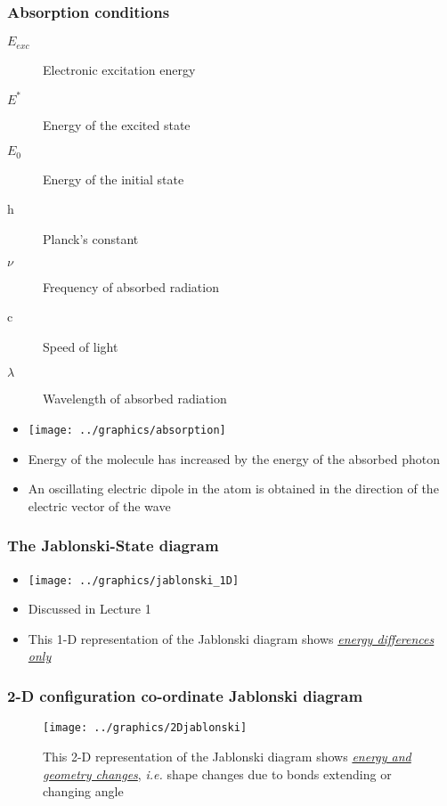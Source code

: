 \documentclass[a4paper,12pt,titlepage]{article}
\begin{document}
\begin{frame}[allowframebreaks]
\frametitle{Absorption conditions}

\begin{description}
\item[\(E_{exc}\)] Electronic excitation energy
\item[\(E^*\)] Energy of the excited state
\item[\(E_0\)] Energy of the initial state
\item[h] Planck's constant
\item[\(\nu\)] Frequency of absorbed radiation
\item[c] Speed of light
\item[\(\lambda\)] Wavelength of absorbed radiation
\end{description}

\begin{itemize}
\item[ ] \texttt{[image: ../graphics/absorption]}
\item Energy of the molecule has increased by the energy of the absorbed photon
\item An oscillating electric dipole in the atom is obtained in the direction of the electric vector of the wave
\end{itemize}

\end{frame}

\begin{frame}
\frametitle{The Jablonski-State diagram}
\begin{itemize}
\item[] \texttt{[image: ../graphics/jablonski\_1D]}
\item Discussed in Lecture 1
\item This 1-D representation of the Jablonski diagram shows \textit{\underline{energy differences only}}
\end{itemize}
\end{frame}

\begin{frame}
\frametitle{2-D configuration co-ordinate Jablonski diagram}
\centering
\begin{figure}[h!]
\texttt{[image: ../graphics/2Djablonski]}
\caption{This 2-D representation of the Jablonski diagram shows \textit{\underline{energy and geometry changes}}, \textit{i.e.} shape changes due to bonds extending or changing angle}
\end{figure}
\end{frame}
\end{document}
